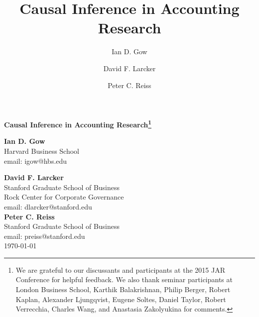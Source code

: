 \documentclass[12pt,reqno,titlepage]{amsart}
\title[Causal Inference in Accounting]{Causal Inference in Accounting Research}
\author{Ian D. Gow}
\author{David F. Larcker}
\author{Peter C. Reiss}
\begin{document}
\usetikzlibrary{automata, shapes, calc, positioning}



\begin{titlepage}
  \centering
  	\begin{large}
  	\textbf{Causal Inference in Accounting Research\footnote{We are grateful to our discussants and participants at the 2015 JAR Conference for helpful feedback. 
  	We also thank seminar participants at London Business School, Karthik Balakrishnan, Philip Berger, Robert Kaplan, Alexander Ljungqvist, Eugene Soltes, Daniel Taylor, Robert Verrecchia, Charles Wang, and Anastasia Zakolyukina for comments.}} \\	
  	\end{large}
  	\vspace{60pt}
	\textbf{Ian D. Gow} \\
	Harvard Business School \\
	email: igow@hbs.edu

  	\vspace{30pt}
	\textbf{David F. Larcker} \\
	Stanford Graduate School of Business \\
	Rock Center for Corporate Governance \\
	email: dlarcker@stanford.edu \\
		
	\vspace{30pt}
	\textbf{Peter C. Reiss} \\
	Stanford Graduate School of Business \\
	email: preiss@stanford.edu \\

	\vspace{30pt}
	\today

\end{titlepage}
\end{document}
